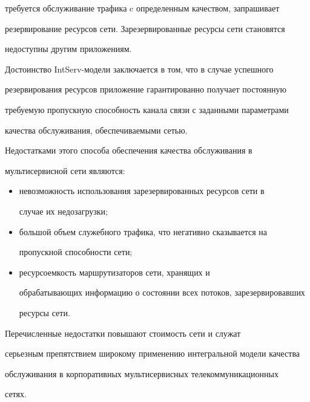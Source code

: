требуется обслуживание трафика c определенным качеством, запрашивает 


резервирование ресурсов сети. Зарезервированные ресурсы сети становятся 


недоступны другим приложениям.


      


      Достоинство IntServ-модели заключается в том, что в случае успешного 


резервирования ресурсов приложение гарантированно получает постоянную 


требуемую пропускную способность канала связи с заданными параметрами 


качества обслуживания, обеспечиваемыми сетью.


      


      Недостатками этого способа обеспечения качества обслуживания в 


мультисервисной сети являются:


      \begin{itemize}


      \item невозможность использования зарезервированных ресурсов сети в 


случае их недозагрузки;


      \item большой объем служебного трафика, что негативно сказывается на 


пропускной способности сети;


      \item ресурсоемкость маршрутизаторов сети, хранящих и 


обрабатывающих информацию о состоянии всех потоков, зарезервировавших 


ресурсы сети.


      \end{itemize}


      


      Перечисленные недостатки повышают стоимость сети и служат 


серьезным препятствием широкому применению интегральной модели качества 


обслуживания в корпоративных мультисервисных телекоммуникационных 


сетях.


      


